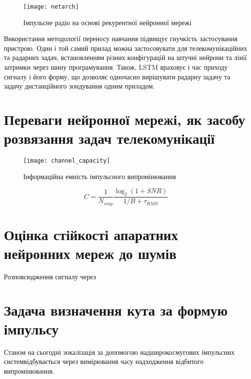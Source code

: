 \begin{figure}[htbp] \begin{center}
\texttt{[image: netarch]}
\caption{Імпульсне радіо на основі рекурентної нейронної мережі} 
\label{fig:rnn_radio}
\end{center} \end{figure}

Використання методології переносу навчання підвищує гнучкість 
застосування пристрою. Один і той самий прилад можна застосовувати для 
телекомунікаційних та радарних задач, встановленням різних 
конфігурацій на штучні нейрони та лінії затримки через шину 
програмування. Також, LSTM враховує і час приходу сигналу і його форму, 
що дозволяє одночасно вирішувати радарну задачу та задачу дистанційного 
зондування одним приладом.

\section{Переваги нейронної мережі, як засобу розвязання задач телекомунікації}

\begin{figure}[htbp] \begin{center}
\texttt{[image: channel\_capacity]}
\caption{Інформаційна емність імпульсного випромінювання} \label{fig:info_cap}
\end{center} \end{figure}

\begin{equation}
C = \frac{1}{N_{smp}} \frac{\log_2 \left( 1 + SNR \right)}{1/B + \tau_{RMS}} 
\end{equation}

\section{Оцінка стійкості апаратних нейронних мереж до шумів}

Розповсюдження сигналу через 

\section{Задача визначення кута за формую імпульсу}

Станом на сьогодні зокалізація за допомогою надширокосмугових імпульсних 
системвідбувається через вимірювання часу надходження відбитого 
випромінювання.

